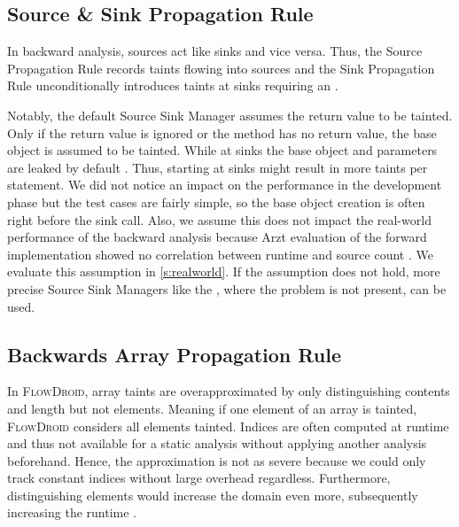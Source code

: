 \documentclass[../draft.tex]{subfiles}
\begin{document}
    \subsection{Source \& Sink Propagation Rule}\label{s:sourcerule}
    In backward analysis, sources act like sinks and vice versa.
    Thus, the Source Propagation Rule records taints flowing into sources and the Sink Propagation Rule unconditionally introduces taints at sinks requiring an .

    Notably, the default Source Sink Manager assumes the return value to be tainted.
    Only if the return value is ignored or the method has no return value, the base object is assumed to be tainted.
    While at sinks the base object and parameters are leaked by default \cite{Arzt2017PhD}.
    Thus, starting at sinks might result in more taints per statement.
    We did not notice an impact on the performance in the development phase but the test cases are fairly simple, so the base object creation is often right before the sink call.
    Also, we assume this does not impact the real-world performance of the backward analysis because Arzt evaluation of the forward implementation showed no correlation between runtime and source count \cite{Arzt2017PhD}.
    We evaluate this assumption in \autoref{s:realworld}.
    If the assumption does not hold, more precise Source Sink Managers like the , where the problem is not present, can be used.

    \subsection{Backwards Array Propagation Rule}
    In \textsc{FlowDroid}, array taints are overapproximated by only distinguishing contents and length but not elements. Meaning if one element of an array is tainted, \textsc{FlowDroid} considers all elements tainted.
    Indices are often computed at runtime and thus not available for a static analysis without applying another analysis beforehand. Hence, the approximation is not as severe because we could only track constant indices without large overhead regardless.
    Furthermore, distinguishing elements would increase the domain even more, subsequently increasing the runtime \cite{Arzt2017PhD}.
\end{document}
